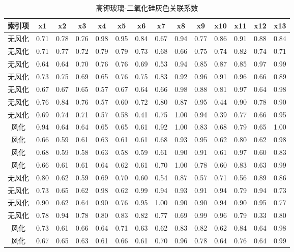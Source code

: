 \documentclass[UTF8]{ctexart}
\begin{document}
\begin{table}[H]
    \centering
    \caption{高钾玻璃-二氧化硅灰色关联系数}
    \begin{tabular}{|c|c|c|c|c|c|c|c|c|c|c|c|c|c|}
        \hline
        索引项 & x1   & x2   & x3   & x4   & x5   & x6   & x7   & x8   & x9   & x10  & x11  & x12  & x13  \\ \hline
        无风化 & 0.71 & 0.78 & 0.76 & 0.98 & 0.95 & 0.84 & 0.67 & 0.94 & 0.77 & 0.86 & 0.91 & 0.88 & 0.84 \\ \hline
        无风化 & 0.71 & 0.77 & 0.72 & 0.79 & 0.79 & 0.73 & 0.68 & 0.66 & 0.75 & 0.74 & 0.82 & 0.74 & 0.71 \\ \hline
        无风化 & 0.64 & 0.64 & 0.70 & 0.76 & 0.76 & 0.69 & 0.53 & 0.94 & 0.85 & 0.87 & 0.85 & 0.97 & 0.99 \\ \hline
        无风化 & 0.73 & 0.75 & 0.69 & 0.65 & 0.76 & 0.75 & 0.83 & 0.92 & 0.96 & 0.91 & 0.96 & 0.66 & 0.89 \\ \hline
        无风化 & 0.67 & 0.67 & 0.65 & 0.57 & 0.67 & 0.64 & 0.66 & 0.98 & 0.88 & 0.81 & 0.97 & 0.64 & 0.98 \\ \hline
        无风化 & 0.76 & 0.84 & 0.76 & 0.57 & 0.60 & 0.72 & 0.80 & 0.87 & 0.95 & 0.44 & 0.90 & 0.78 & 0.90 \\ \hline
        无风化 & 0.69 & 0.74 & 0.71 & 0.57 & 0.58 & 0.41 & 0.75 & 1.00 & 0.94 & 0.39 & 0.77 & 0.66 & 0.95 \\ \hline
        风化   & 0.94 & 0.64 & 0.64 & 0.65 & 0.65 & 0.61 & 0.92 & 1.00 & 0.83 & 0.68 & 0.79 & 0.65 & 1.00 \\ \hline
        风化   & 0.66 & 0.59 & 0.61 & 0.63 & 0.61 & 0.61 & 0.68 & 0.93 & 0.95 & 0.62 & 0.80 & 0.62 & 0.98 \\ \hline
        风化   & 0.68 & 0.59 & 0.58 & 0.63 & 0.58 & 0.59 & 0.61 & 0.90 & 0.91 & 0.61 & 0.97 & 0.60 & 0.83 \\ \hline
        风化   & 0.66 & 0.61 & 0.61 & 0.64 & 0.62 & 0.61 & 0.70 & 1.00 & 0.78 & 0.60 & 0.83 & 0.63 & 0.99 \\ \hline
        无风化 & 0.80 & 0.62 & 0.59 & 0.69 & 0.70 & 0.60 & 0.54 & 0.87 & 0.57 & 0.71 & 0.56 & 0.89 & 0.86 \\ \hline
        无风化 & 0.73 & 0.65 & 0.62 & 0.98 & 0.62 & 0.99 & 0.94 & 0.93 & 0.91 & 0.94 & 0.79 & 0.94 & 0.73 \\ \hline
        无风化 & 0.90 & 0.62 & 0.64 & 0.90 & 0.76 & 0.95 & 1.00 & 0.90 & 0.90 & 0.94 & 0.90 & 0.95 & 0.77 \\ \hline
        无风化 & 0.78 & 0.94 & 0.78 & 0.80 & 0.83 & 0.82 & 0.77 & 0.69 & 0.99 & 0.96 & 0.79 & 0.33 & 0.80 \\ \hline
        风化   & 0.73 & 0.61 & 0.66 & 0.64 & 0.71 & 0.63 & 0.62 & 0.83 & 0.82 & 0.62 & 0.84 & 0.64 & 0.98 \\ \hline
        风化   & 0.67 & 0.65 & 0.63 & 0.61 & 0.66 & 0.61 & 0.70 & 0.96 & 0.78 & 0.64 & 0.76 & 0.64 & 0.99 \\ \hline
    \end{tabular}
\end{table}
\end{document}
